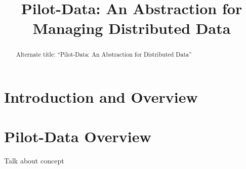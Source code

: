 \documentclass[conference]{IEEEtran}
\begin{document}

\title{Pilot-Data: An Abstraction for Managing Distributed Data}

\author{}

\date{}
\maketitle

\begin{abstract} 

Alternate title: ``Pilot-Data: An Abstraction for Distributed Data''




\end{abstract}

\section{Introduction and Overview} 




\section{Pilot-Data Overview}

Talk about concept
\end{document}
